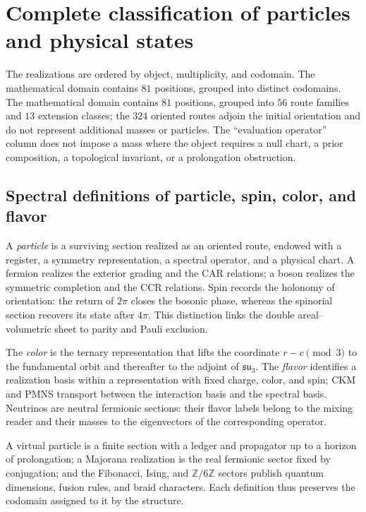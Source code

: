 \section{Complete classification of particles and physical states}
\label{sec:catalogo-realizaciones-tipadas-rev8}

The realizations are ordered by object, multiplicity, and codomain. The mathematical domain contains \(81\) positions, grouped into
distinct codomains. The mathematical domain contains \(81\) positions, grouped into
\(56\) route families and \(13\) extension classes; the \(324\)
oriented routes adjoin the initial orientation and do not represent additional masses
or particles. The ``evaluation operator'' column does not impose a mass where the object requires
a null chart, a prior composition, a topological invariant, or a
prolongation obstruction.

\subsection{Spectral definitions of particle, spin, color, and flavor}

A \emph{particle} is a surviving section realized as an oriented route, endowed with a register, a symmetry representation, a spectral operator, and a physical chart. A fermion realizes the exterior grading and the CAR relations; a boson realizes the symmetric completion and the CCR relations. Spin records the holonomy of orientation: the return of \(2\pi\) closes the bosonic phase, whereas the spinorial section recovers its state after \(4\pi\). This distinction links the double areal--volumetric sheet to parity and Pauli exclusion.

The \emph{color} is the ternary representation that lifts the coordinate
\(r-c\pmod3\) to the fundamental orbit and thereafter to the adjoint of
\(\mathfrak{su}_3\). The \emph{flavor} identifies a realization basis
within a representation with fixed charge, color, and spin; CKM and PMNS
transport between the interaction basis and the spectral basis. Neutrinos
are neutral fermionic sections: their flavor labels belong to the
mixing reader and their masses to the eigenvectors of the corresponding operator.

A virtual particle is a finite section with a ledger and propagator up to
a horizon of prolongation; a Majorana realization is the real
fermionic sector fixed by conjugation; and the Fibonacci, Ising, and
\(\mathbb Z/6\mathbb Z\) sectors publish quantum dimensions, fusion rules, and
braid characters. Each definition thus preserves the codomain assigned to it by the
structure.

